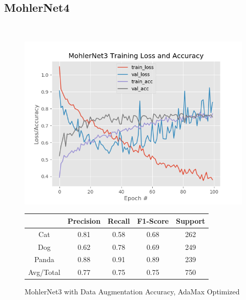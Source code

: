 \documentclass[12pt]{article}
\begin{document}
\subsection{MohlerNet4}

\begin{center}
	 \\
\end{center}


\begin{figure}[h]
	\centering %
	\captionsetup{justification=centering}
	\begin{minipage}{0.5\textwidth}
		\centering %
		\includegraphics[width=1\textwidth]{MohlerNet3_opt-AdamaxAugmented_KEEP.png}
		\caption{MohlerNet3 with Data Augmentation Accuracy, AdaMax Optimized} \label{MN3Aug}
	\end{minipage}\hfill
	\begin{minipage}{0.5\textwidth}
		\begin{center}
			\begin{tabular}[5pt]{| c| c| c| c|c|}
				\hline
				& Precision & Recall & F1-Score & Support \\[0.5ex] 
				\hline 	
				Cat   &    0.81&      0.58 &     0.68  &     262\\ \hline 
				Dog    &   0.62 &     0.78 &     0.69 &      249    \\ \hline 
				Panda   &   0.88&      0.91  &    0.89  &     239   \\ \hline 
				Avg/Total  &    0.77 &     0.75   &   0.75   &    750\\ \hline 
				
			\end{tabular}
			\label{MN3RAug}
		\end{center}	
	\end{minipage}
\end{figure}
\end{document}
